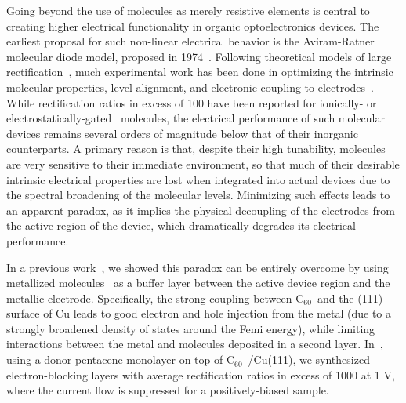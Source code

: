 \documentclass[11pt,showpacs,amsmath,amssymbl]{revtex4}
\newcommand{\buck}{C$_{60}$~}
\begin{document}
\newpage


Going beyond the use of molecules as merely resistive elements is central to creating higher electrical functionality in organic optoelectronics devices. 
The earliest proposal for such non-linear electrical behavior is the Aviram-Ratner molecular diode model, proposed in 1974~\cite{Aviram:1974eh}. Following theoretical models of large rectification~\cite{taylor2002theory,Andrews08-jacs}, much experimental work has been done in optimizing the intrinsic molecular properties, level alignment, and electronic coupling to electrodes~\cite{dhirani97-jcp,diezperez09-nc,kushmerick02-prl,selzer02-jpcb,guedon2012observation,batra2013tuning,Kim14-pnas,capozzi2015single,randel2014unconventional,perrin2016gate}. While rectification ratios in excess of 100 have been reported for ionically-\cite{capozzi2015single} or electrostatically-gated~\cite{perrin2016gate} molecules, the electrical performance of such molecular devices remains several orders of magnitude below that of their inorganic counterparts.   A primary reason is that, despite their high tunability, molecules are very sensitive to their immediate environment, so that much of their desirable intrinsic electrical properties are lost when integrated into actual devices due to the spectral broadening of the molecular levels. Minimizing such effects leads to an apparent paradox, as it implies the physical decoupling of the electrodes from the active region of the device, which dramatically degrades its electrical performance.

In a previous work~\cite{smerdon2016large}, we showed this paradox can be entirely overcome by using metallized molecules~\cite{LuCrommie} as a buffer layer between the active device region and the metallic electrode. Specifically, the strong coupling between \buck and the (111) surface of Cu leads to good electron and hole injection from the metal (due to a strongly broadened density of states around the Femi energy), while limiting interactions between the metal and molecules deposited in a second layer. In~\cite{smerdon2016large}, using a donor pentacene monolayer on top of \buck/Cu(111), we synthesized electron-blocking layers with average rectification ratios in excess of 1000 at 1 V, where the current flow is suppressed for a positively-biased sample.
 
\end{document}
